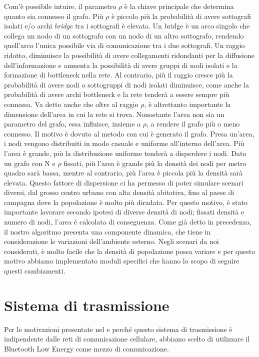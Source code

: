 Com'è possibile intuire, il parametro $\rho$ è la chiave principale che determina quanto sia connesso il grafo. Più $\rho$ è piccolo più la probabilità di avere sottografi isolati e/o archi \textit{bridge} tra i sottografi è elevata. Un bridge è un arco singolo che collega un nodo di un sottografo con un nodo di un altro sottografo, rendendo quell'arco l'unica possibile via di comunicazione tra i due sottografi. Un raggio ridotto, diminuisce la possibilità di avere collegamenti ridondanti per la diffusione dell'informazione e aumenta la possibilità di avere gruppi di nodi isolati e la formazione di bottleneck nella rete. Al contrario, più il raggio cresce più la probabilità di avere nodi o sottogruppi di nodi isolati diminuisce, come anche la probabilità di avere archi bottleneck e la rete tenderà a essere sempre più connessa. Va detto anche che oltre al raggio $\rho$, è altrettanto importante la dimensione dell'area in cui la rete si trova. Nonostante l'area non sia un parametro del grafo, essa influisce, insieme a $\rho$, a rendere il grafo più o meno connesso. Il motivo è dovuto al metodo con cui è generato il grafo. Presa un'area, i nodi vengono distribuiti in modo casuale e uniforme all'interno dell'area. Più l'area è grande, più la distribuzione uniforme tenderà a disperdere i nodi. Dato un grafo con N e $\rho$ fissati, più l'area è grande più la densità dei nodi per metro quadro sarà bassa, mentre al contrario, più l'area è piccola più la densità sarà elevata. Questo fattore di dispersione ci ha permesso di poter simulare scenari diversi, dal grosso centro urbano con alta densità abitativa, fino al paese di campagna dove la popolazione è molto più diradata. Per questo motivo, è stato importante lavorare secondo ipotesi di diverse densità di nodi; fissati densità e numero di nodi, l'area è calcolata di conseguenza. Come già detto in precedenza, il nostro algoritmo presenta una componente dinamica, che tiene in considerazione le variazioni dell'ambiente esterno. Negli scenari da noi considerati, è molto facile che la densità di popolazione possa variare e per questo motivo abbiamo implementato moduli specifici che hanno lo scopo di seguire questi cambiamenti.

\section{Sistema di trasmissione}
Per le motivazioni presentate nel  e perché questo sistema di trasmissione è indipendente dalle reti di comunicazione cellulare, abbiamo scelto di utilizzare il Bluetooth Low Energy come mezzo di comunicazione.

